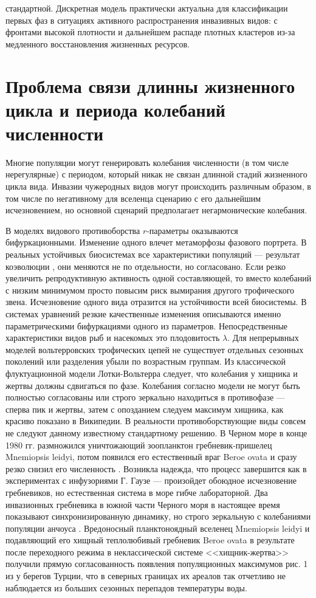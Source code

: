 \documentclass[a4paper,11pt,twoside]{article}
\begin{document}
стандартной.  Дискретная модель практически актуальна для классификации первых фаз в ситуациях активного распространения инвазивных видов: с фронтами высокой плотности и дальнейшем распаде плотных кластеров из-за медленного восстановления жизненных ресурсов.

\section{Проблема связи длинны жизненного цикла и периода колебаний численности}

Многие популяции могут генерировать колебания численности (в том числе нерегулярные) с периодом, который никак не связан длинной стадий жизненного цикла вида. Инвазии чужеродных видов могут происходить различным образом, в том числе по негативному для вселенца сценарию с его дальнейшим исчезновением, но основной сценарий предполагает негармонические колебания. 

В моделях видового противоборства $r$-параметры оказываются бифуркационными. Изменение одного влечет метаморфозы фазового портрета. В реальных устойчивых биосистемах все характеристики популяций --- результат коэволюции \cite{JOB}, они меняются не по отдельности, но согласовано. Если резко увеличить репродуктивную активность одной составляющей, то вместо колебаний с низким минимумом просто повысим риск вымирания другого трофического звена. Исчезновение одного вида отразится на устойчивости всей биосистемы. В системах уравнений резкие качественные изменения описываются именно параметрическими бифуркациями одного из параметров.  Непосредственные характеристики видов рыб и насекомых это плодовитость $\lambda$. Для непрерывных моделей вольтерровских трофических цепей не существует отдельных сезонных поколений или разделения убыли по возрастным группам.  Из классической флуктуационной модели Лотки-Вольтерра следует, что колебания у хищника и жертвы должны сдвигаться по фазе. Колебания согласно модели не могут быть полностью согласованы или строго зеркально находиться в противофазе --- сперва пик и жертвы, затем с опозданием следуем максимум хищника, как красиво показано в Википедии. В реальности противоборствующие виды совсем не следуют данному известному стандартному решению. В Черном море в конце 1980 гг. размножился уничтожающий зоопланктон гребневик-пришелец Mnemiopsis leidyi, потом появился его естественный враг Beroe ovata и сразу резко снизил его численность \cite{Finenko}. Возникла надежда, что процесс завершится как в экспериментах с инфузориями Г. Гаузе --- произойдет обоюдное исчезновение гребневиков, но естественная система в море гибче лабораторной. Два инвазионных гребневика в южной части Черного моря в настоящее время показывают синхронизированную динамику, но строго зеркальную с колебаниями популяции анчоуса \cite{Turka}. Вредоносный планктоноядный вселенец  Mnemiopsis leidyi и подавляющий его хищный теплолюбивый гребневик Beroe ovata в результате после переходного режима в неклассической системе <<хищник-жертва>> получили прямую согласованность появления популяционных максимумов рис. 1 из \cite{Bilio} у берегов Турции, что в северных границах их ареалов так отчетливо не наблюдается из больших сезонных перепадов температуры воды.  
\end{document}
